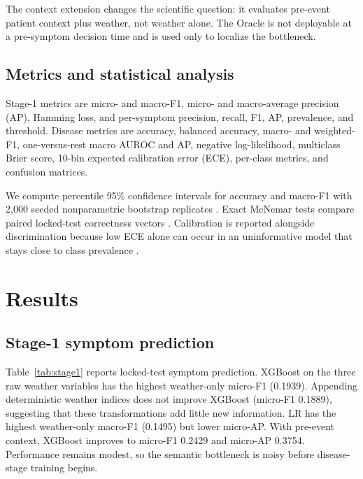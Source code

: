 \documentclass[conference]{IEEEtran}
\begin{document}
The context extension changes the scientific question: it evaluates pre-event
patient context plus weather, not weather alone. The Oracle is not deployable
at a pre-symptom decision time and is used only to localize the bottleneck.

\subsection{Metrics and statistical analysis}

Stage-1 metrics are micro- and macro-F1, micro- and macro-average precision
(AP), Hamming loss, and per-symptom precision, recall, F1, AP, prevalence, and
threshold. Disease metrics are accuracy, balanced accuracy, macro- and
weighted-F1, one-versus-rest macro AUROC and AP, negative log-likelihood,
multiclass Brier score, 10-bin expected calibration error (ECE), per-class
metrics, and confusion matrices.

We compute percentile 95\% confidence intervals for accuracy and macro-F1 with
2,000 seeded nonparametric bootstrap replicates \cite{efron1993}. Exact
McNemar tests compare paired locked-test correctness vectors
\cite{mcnemar1947}. Calibration is reported alongside discrimination because
low ECE alone can occur in an uninformative model that stays close to class
prevalence \cite{guo2017}.

\section{Results}

\subsection{Stage-1 symptom prediction}

Table~\ref{tab:stage1} reports locked-test symptom prediction. XGBoost on the
three raw weather variables has the highest weather-only micro-F1 (0.1939).
Appending deterministic weather indices does not improve XGBoost
(micro-F1 0.1889), suggesting that these transformations add little new
information. LR has the highest weather-only macro-F1 (0.1495) but lower
micro-AP. With pre-event context, XGBoost improves to micro-F1 0.2429 and
micro-AP 0.3754. Performance remains modest, so the semantic bottleneck is
noisy before disease-stage training begins.
\end{document}

